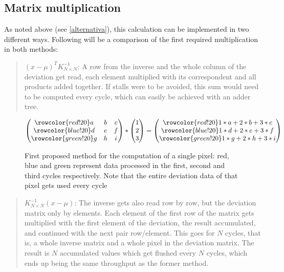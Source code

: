 \subsection{Matrix multiplication}


\newcommand\rb{\colorbox{red!20}}
\newcommand\bb{\colorbox{blue!20}}
\newcommand\gb{\colorbox{green!20}}
\newcommand\rr{\rowcolor{red!20}}
\newcommand\br{\rowcolor{blue!20}}
\newcommand\gr{\rowcolor{green!20}}
As noted above (see \ref{alternativa}), this calculation can be implemented in two different ways.
\noindent Following will be a comparison of the first required multiplication in both methods:
\begin{quote}
	\((x-\mu)^{T} K^{-1}_{N \times N}\):	
	A row from the inverse and the whole column of the deviation get read, each element multiplied with its correspondent and all products added together. If stalls were to be avoided, this sum would need to be computed every cycle, which can easily be achieved with an adder tree.
\end{quote}

\begin{figure}[h]%
\[
\begin{pmatrix}
\rr a & b & c \\ 
\br d & e & f \\ 
\gr g & h & i
\end{pmatrix}
*
\begin{pmatrix}
1\\
2\\
3
\end{pmatrix}
=
\begin{pmatrix}
\rr 1*a+2*b+3*c\\
\br 1*d+2*e+3*f\\
\gr 1*g+2*h+3*i
\end{pmatrix} 
\]
\caption[First proposed method for the matrix multiplication]{First proposed method for the computation of a single pixel: red, blue and green represent data processed in the first, second and third cycles respectively. Note that the entire deviation data of that pixel gets used every cycle}
\end{figure}
		
\begin{quote}
	\(K^{-1}_{N \times N} (x-\mu)\):
	The inverse gets also read row by row, but the deviation matrix only by elements. Each element of the first row of the matrix gets multiplied with the first element of the deviation, the result accumulated, and continued with the next pair row/element. This goes for \(N\) cycles, that is, a whole inverse matrix and a whole pixel in the deviation matrix. The result is \(N\) accumulated values which get flushed every \(N\) cycles, which ends up being the same throughput as the former method.
\end{quote}

